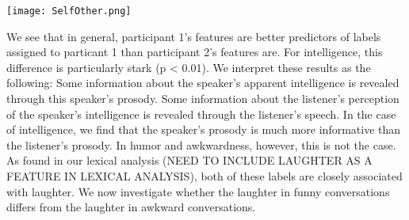 \documentclass[11pt]{article}
\begin{document}
\begin{center}
\texttt{[image: SelfOther.png]} 
\end{center}
We see that in general, participant 1's features are better predictors of labels assigned to particant 1 than participant 2's features are.  For intelligence, this difference is particularly stark (p < 0.01).  We interpret these results as the following: Some information about the speaker's apparent intelligence is revealed through this speaker's prosody.  Some information about the listener's perception of the speaker's intelligence is revealed through the listener's speech.  In the case of intelligence, we find that the speaker's prosody is much more informative than the listener's prosody.  In humor and awkwardness, however, this is not the case.  As found in our lexical analysis (NEED TO INCLUDE LAUGHTER AS A FEATURE IN LEXICAL ANALYSIS), both of these labels are closely associated with laughter.  We now investigate whether the laughter in funny conversations differs from the laughter in awkward conversations.


\end{document}

